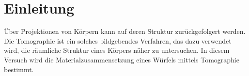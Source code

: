 \section{Einleitung}
Über Projektionen von Körpern kann auf deren Struktur zurückgefolgert werden.
Die Tomographie ist ein solches bildgebendes Verfahren, das dazu verwendet wird, die räumliche Struktur eines Körpers näher zu untersuchen.
In diesem Versuch wird die Materialzusammensetzung eines Würfels mittels Tomographie bestimmt.
